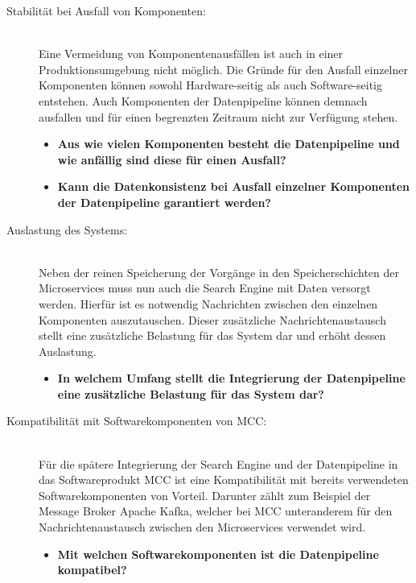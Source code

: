 \begin{description}
    \item[Stabilität bei Ausfall von Komponenten:]\hfill \\
    Eine Vermeidung von Komponentenausfällen ist auch in einer Produktionsumgebung nicht möglich. Die Gründe für den Ausfall einzelner Komponenten können sowohl Hardware-seitig als auch Software-seitig entstehen. Auch Komponenten der Datenpipeline können demnach ausfallen und für einen begrenzten Zeitraum nicht zur Verfügung stehen.

    \begin{itemize}
        \item \textbf{Aus wie vielen Komponenten besteht die Datenpipeline und wie anfällig sind diese für einen Ausfall?}
        \item \textbf{Kann die Datenkonsistenz bei Ausfall einzelner Komponenten der Datenpipeline garantiert werden?}
    \end{itemize}
    
    \item[Auslastung des Systems:]\hfill \\
    Neben der reinen Speicherung der Vorgänge in den Speicherschichten der Microservices muss nun auch die Search Engine mit Daten versorgt werden. Hierfür ist es notwendig Nachrichten zwischen den einzelnen Komponenten auszutauschen. Dieser zusätzliche Nachrichtenaustausch stellt eine zusätzliche Belastung für das System dar und erhöht dessen Auslastung.

    \begin{itemize}
        \item \textbf{In welchem Umfang stellt die Integrierung der Datenpipeline eine zusätzliche Belastung für das System dar?}
    \end{itemize}

    \item[Kompatibilität mit Softwarekomponenten von MCC:]\hfill \\
    Für die spätere Integrierung der Search Engine und der Datenpipeline in das Softwareprodukt MCC ist eine Kompatibilität mit bereits verwendeten Softwarekomponenten von Vorteil. Darunter zählt zum Beispiel der Message Broker \glqq Apache Kafka\grqq{}, welcher bei MCC unteranderem für den Nachrichtenaustausch zwischen den Microservices verwendet wird.

    \begin{itemize}
        \item \textbf{Mit welchen Softwarekomponenten ist die Datenpipeline kompatibel?}
    \end{itemize}

\end{description}


